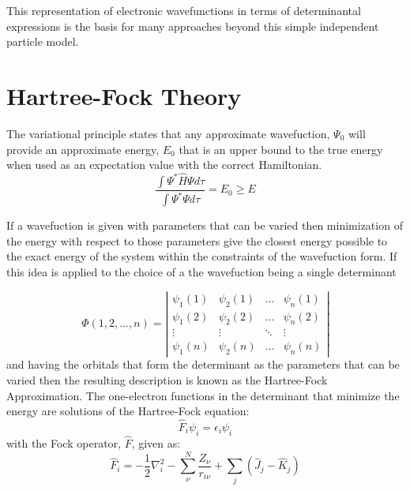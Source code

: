 This representation of electronic wavefunctions in terms of determinantal expressions is the basis for many approaches beyond this simple independent particle model.
  
  
%
%  
\section{Hartree-Fock Theory}


The variational principle states that any approximate wavefuction, $\Psi_0$ will provide an approximate energy, $E_0$ that is an upper bound to the true energy when used as an expectation value with the correct Hamiltonian.\cite{VPrinc} 
\begin{equation}
\frac{\int{\Psi^*\widehat{H}\Psi d\tau}}{\int{\Psi^* \Psi d\tau}} = E_0 \geq E
\end{equation}

 If a wavefuction is given with parameters that can be varied then minimization of the energy with respect to those parameters give the closest energy possible to the exact energy of the system within the constraints of the wavefuction form.  If this idea is applied to the choice of a the wavefuction being a single determinant 

\begin{equation}
\Phi(1,2,...,n)=\left|
\begin{array}{cccc}
	\psi_1(1) & \psi_2(1) & \ldots & \psi_n(1) \\
	\psi_1(2) & \psi_2(2) & \ldots & \psi_n(2) \\
	\vdots & \vdots & \ddots & \vdots \\
	\psi_1(n) & \psi_2(n) & \ldots & \psi_n(n)
	\end{array} \right|
\end{equation}
and having the orbitals that form the determinant as the parameters that can be varied then the resulting description is known as the Hartree-Fock Approximation.   The one-electron functions in the determinant that minimize the energy are  solutions of the Hartree-Fock equation:
\begin{equation}
\widehat{F}_i\psi_i = \epsilon_i\psi_i
\label{HFeq}
\end{equation}
with the Fock operator, $\widehat{F}$, given as:
\begin{equation}
\widehat{F}_i = -\frac{1}{2}\nabla_i^2 - \sum_\nu^N{\frac{Z_\nu}{r_{i\nu}}} + \sum_j{\left(\widehat{J}_j - \widehat{K}_j\right)}
\end{equation}

